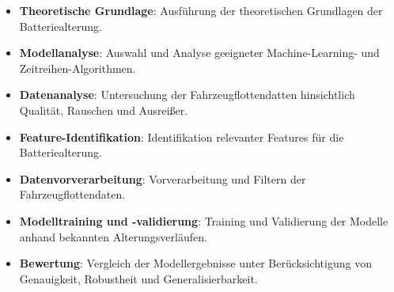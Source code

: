 \begin{itemize}
    \item \textbf{Theoretische Grundlage}: Ausführung der theoretischen Grundlagen der Batteriealterung.
    \item \textbf{Modellanalyse}: Auswahl und Analyse geeigneter Machine-Learning- und Zeitreihen-Algorithmen.
    \item \textbf{Datenanalyse}: Untersuchung der Fahrzeugflottendatten hinsichtlich Qualität, Rauschen und Ausreißer.
    \item \textbf{Feature-Identifikation}: Identifikation relevanter Features für die Batteriealterung.
    \item \textbf{Datenvorverarbeitung}: Vorverarbeitung und Filtern der Fahrzeugflottendaten.
    \item \textbf{Modelltraining und -validierung}: Training und Validierung der Modelle anhand bekannten Alterungsverläufen.
    \item \textbf{Bewertung}: Vergleich der Modellergebnisse unter Berücksichtigung von Genauigkeit, Robustheit und Generalisierbarkeit.
\end{itemize}
